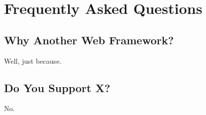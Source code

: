 \chapter{Frequently Asked Questions}

\section{Why Another Web Framework?}
Well, just because.

\section{Do You Support X?}
No.
